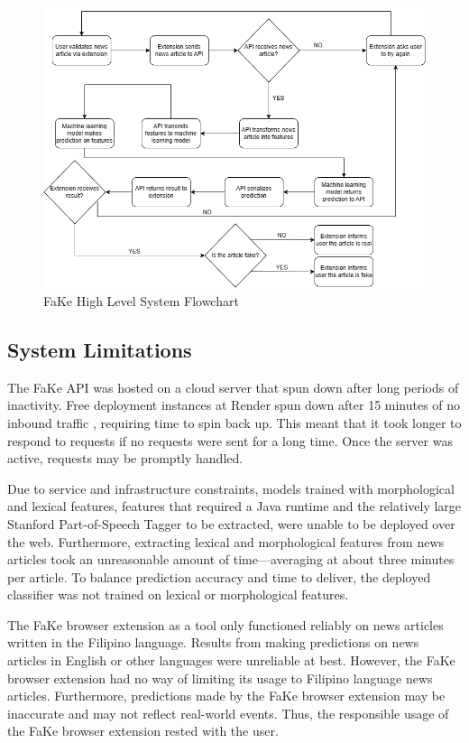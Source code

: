 \begin{figure}[h]
\includegraphics[width=\textwidth,height=\textheight,keepaspectratio]{figures/FakeSystemFlowchart.png}
  \caption{FaKe High Level System Flowchart}
  \label{SystemFlowchart}
\end{figure}
\clearpage

\subsection{System Limitations} \label{extension-limitations}

The FaKe API was hosted on a cloud server that spun down after long periods of inactivity. Free deployment instances at Render spun down after 15 minutes of no inbound traffic \cite{render-docs}, requiring time to spin back up. This meant that it took longer to respond to requests if no requests were sent for a long time. Once the server was active, requests may be promptly handled. 

Due to service and infrastructure constraints, models trained with morphological and lexical features, features that required a Java runtime and the relatively large Stanford Part-of-Speech Tagger to be extracted, were unable to be deployed over the web. Furthermore, extracting lexical and morphological features from news articles took an unreasonable amount of time—averaging at about three minutes per article. To balance prediction accuracy and time to deliver, the deployed classifier was not trained on lexical or morphological features.

The FaKe browser extension as a tool only functioned reliably on news articles written in the Filipino language. Results from making predictions on news articles in English or other languages were unreliable at best. However, the FaKe browser extension had no way of limiting its usage to Filipino language news articles. Furthermore, predictions made by the FaKe browser extension may be inaccurate and may not reflect real-world events. Thus, the responsible usage of the FaKe browser extension rested with the user.

